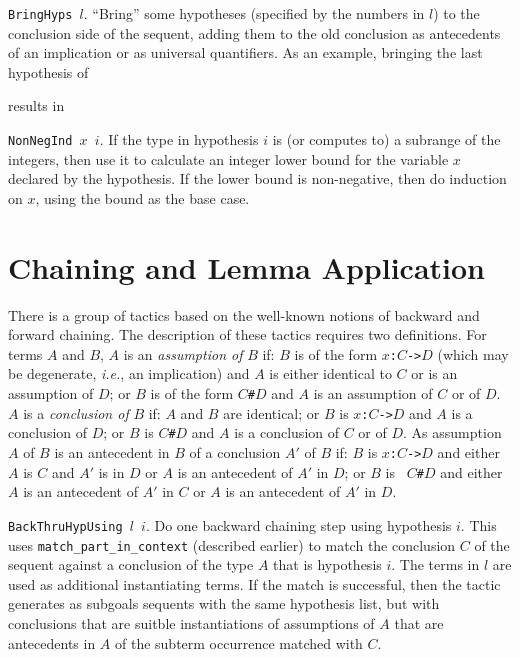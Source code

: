 {\tt BringHyps $l$}.  ``Bring'' some hypotheses (specified by the numbers in $l$) to
the conclusion side of the sequent, adding them to the old conclusion as
antecedents of an implication or as universal quantifiers.  As an example,
bringing the last hypothesis of
\begin{Numath}
\end{Numath}%
results in
\begin{Numath}
\end{Numath}%

{\tt NonNegInd $x$ $i$}.  If the type in hypothesis $i$ is (or computes to) a
subrange of the integers, then use it to calculate an integer lower bound for
the variable $x$ declared by the hypothesis.  If the lower bound is
non-negative, then do induction on $x$, using the bound as the base case.



\section{Chaining and Lemma Application}

There is a group of tactics based on the well-known notions of backward
and forward chaining.  The description of these tactics requires two
definitions.  For terms $A$ and $B$, $A$
is an {\em assumption of} $B$ if: $B$ is of the form {\tt $x$:$C$->$D$} (which
may be degenerate, {\em i.e.}, an implication) and $A$ is either identical to
$C$ or is an assumption of $D$; or $B$ is of the form {\tt $C$\#$D$} and $A$ is
an assumption of $C$ or of $D$.  $A$ is a {\em conclusion of} $B$ if: $A$ and
$B$ are identical; or $B$
is {\tt $x$:$C$->$D$} and $A$ is a
conclusion of $D$; or $B$ is {\tt $C$\#$D$} and $A$ is a conclusion
of $C$ or of $D$.  As assumption $A$ of $B$ is an antecedent in $B$ of a
conclusion $A'$ of $B$ if: $B$ is {\tt $x$:$C$->$D$} and either $A$ is $C$
and $A'$ is in $D$ or $A$ is an antecedent of $A'$ in $D$; or $B$ is {\tt
$C$\#$D$} and either $A$ is an antecedent of $A'$ in $C$ or $A$ is an
antecedent of $A'$ in $D$.

{\tt BackThruHypUsing $l$ $i$}.  Do one backward chaining step using hypothesis
$i$.  This uses {\tt match\_part\_in\_context} (described earlier) to match the
conclusion $C$ of the sequent against a conclusion of the type $A$ that is 
hypothesis $i$.  The terms in $l$ are used as additional instantiating terms.
If the match is successful, then the tactic generates as subgoals sequents with
the same hypothesis list, but with conclusions that are suitble
instantiations of assumptions of $A$
that are antecedents in $A$ of the subterm occurrence matched with $C$.

